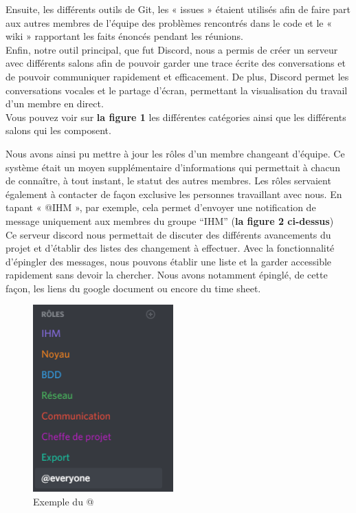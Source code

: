 \documentclass[a4paper,11pt]{article}
\begin{document}
Ensuite, les différents outils de Git, les « issues » étaient utilisés afin de faire part aux autres membres de l’équipe des problèmes rencontrés dans le code et le « wiki »  rapportant les faits énoncés pendant les réunions. \\




Enfin, notre outil principal, que fut Discord, nous a permis de créer un serveur avec différents salons afin de pouvoir garder une trace écrite des conversations et de pouvoir communiquer rapidement et efficacement. De plus, Discord permet les conversations vocales et le partage d’écran, permettant la visualisation du travail d’un membre en direct. \\



Vous pouvez voir sur \textbf{la figure 1} les différentes catégories ainsi que les différents salons qui les composent. \\

\newpage

Nous avons ainsi pu mettre à jour les rôles d’un membre changeant d’équipe. Ce système était un moyen supplémentaire d’informations qui permettait à chacun de connaître, à tout instant, le statut des autres membres. Les rôles servaient également à contacter de façon exclusive les personnes travaillant avec nous.  En tapant « @IHM », par exemple, cela permet d’envoyer une notification de message uniquement aux membres du groupe  “IHM” (\textbf{la figure 2 ci-dessus}) \\

Ce serveur discord nous permettait de discuter des différents avancements du projet et d’établir des listes des changement à effectuer. Avec la fonctionnalité d’épingler des messages, nous pouvons établir une liste et la garder accessible rapidement sans devoir la chercher. Nous avons notamment épinglé, de cette façon, les liens du google document ou encore du time sheet. \\


\begin{figure}
	\begin{center}
	\includegraphics[width=0.48\textwidth]{Img/image5.png}
	\end{center}
	\caption{Exemple du @}	
\end{figure}
\end{document}
